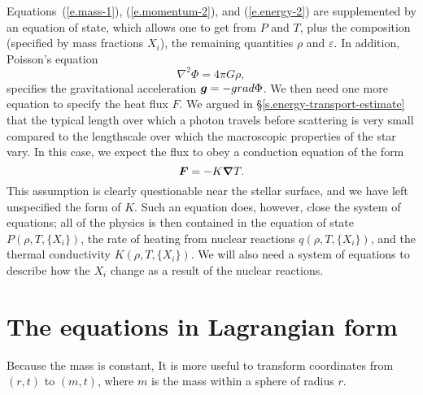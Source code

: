 Equations~(\ref{e.mass-1}), (\ref{e.momentum-2}), and (\ref{e.energy-2}) are supplemented by an equation of state, which allows one to get from $P$ and $T$, plus the composition (specified by mass fractions $X_{i}$), the remaining quantities $\rho$ and $\varepsilon$. In addition, Poisson's equation
\begin{equation}\label{e.poisson}
\nabla^{2}\Phi = 4\pi G\rho,
\end{equation}
specifies the gravitational acceleration $\boldsymbol{g} = -grad\Phi$. We then need one more equation to specify the heat flux $F$. We argued in \S\ref{s.energy-transport-estimate} that the typical length over which a photon travels before scattering is very small compared to the lengthscale over which the macroscopic properties of the star vary.  In this case, we expect the flux to obey a conduction equation of the form
\begin{equation}\label{e.conduction-simple}
\boldsymbol{F} = -K\boldsymbol{\nabla} T.
\end{equation}
This assumption is clearly questionable near the stellar surface, and we have left unspecified the form of $K$.  Such an equation does, however, close the system of equations; all of the physics is then contained in the equation of state $P(\rho,T,\{X_{i}\})$, the rate of heating from nuclear reactions $q(\rho, T, \{X_{i}\})$, and the thermal conductivity $K(\rho,T,\{X_{i}\})$.  We will also need a system of equations to describe how the $X_{i}$ change as a result of the nuclear reactions.

\section{The equations in Lagrangian form}

Because the mass is constant, It is more useful to transform coordinates from $(r,t)$ to $(m,t)$, where $m$ is the mass within a sphere of radius $r$.  

